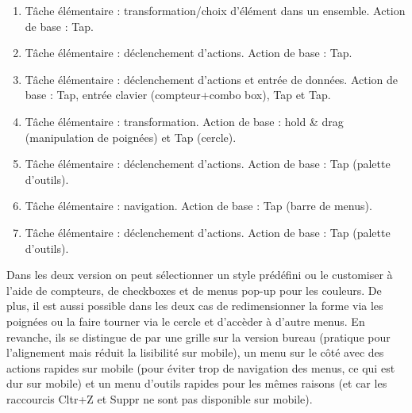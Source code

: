 \documentclass{article}
\begin{document}
\begin{enumerate}[label=\arabic*)]
    \item Tâche élémentaire : transformation/choix d'élément dans un ensemble. Action de base : Tap.
    \item Tâche élémentaire : déclenchement d'actions. Action de base : Tap.
    \item Tâche élémentaire : déclenchement d'actions et entrée de données. Action de base : Tap, entrée clavier (compteur+combo box), Tap et Tap.
    \item Tâche élémentaire : transformation. Action de base : hold \& drag (manipulation de poignées) et Tap (cercle).
    \item Tâche élémentaire : déclenchement d'actions. Action de base : Tap (palette d'outils).
    \item Tâche élémentaire : navigation. Action de base : Tap (barre de menus).
    \item Tâche élémentaire : déclenchement d'actions. Action de base : Tap (palette d'outils).
    
\end{enumerate}

\vspace{2cm}

Dans les deux version on peut sélectionner un style prédéfini ou le customiser à l'aide de compteurs, de checkboxes et de menus pop-up pour les couleurs. De plus, il est aussi possible dans les deux cas de redimensionner la forme via les poignées ou la faire tourner via le cercle et d'accèder à d'autre menus.
En revanche, ils se distingue de par une grille sur la version bureau (pratique pour l'alignement mais réduit la lisibilité sur mobile), un menu sur le côté avec des actions rapides sur mobile (pour éviter trop de navigation des menus, ce qui est dur sur mobile) et un menu d'outils rapides pour les mêmes raisons (et car les raccourcis Cltr+Z et Suppr ne sont pas disponible sur mobile).



\end{document}
